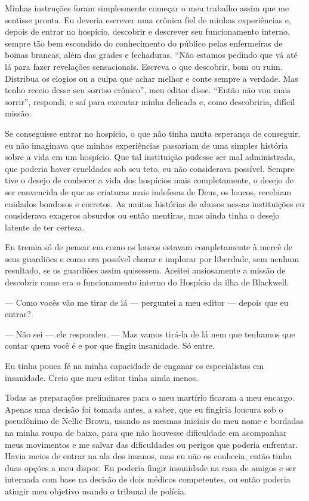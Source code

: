 Minhas instruções foram simplesmente começar o meu trabalho assim que me
sentisse pronta. Eu deveria escrever uma crônica fiel de minhas
experiências e, depois de entrar no hospício, descobrir e descrever seu
funcionamento interno, sempre tão bem escondido do conhecimento do
público pelas enfermeiras de boinas brancas, além das grades e
fechaduras. ``Não estamos pedindo que vá até lá para fazer revelações
sensacionais. Escreva o que descobrir, bom ou ruim. Distribua os elogios
ou a culpa que achar melhor e conte sempre a verdade. Mas tenho receio
desse seu sorriso crônico'', meu editor disse. ``Então não vou mais
sorrir'', respondi, e saí para executar minha delicada e, como
descobriria, difícil missão.

Se conseguisse entrar no hospício, o que não tinha muita esperança de
conseguir, eu não imaginava que minhas experiências passariam de uma
simples história sobre a vida em um hospício. Que tal instituição
pudesse ser mal administrada, que poderia haver crueldades sob seu teto,
eu não considerava possível. Sempre tive o desejo de conhecer a vida dos
hospícios mais completamente, o desejo de ser convencida de que as
criaturas mais indefesas de Deus, os loucos, recebiam cuidados bondosos
e corretos. As muitas histórias de abusos nessas instituições eu
considerava exageros absurdos ou então mentiras, mas ainda tinha o
desejo latente de ter certeza.

Eu tremia só de pensar em como os loucos estavam completamente à mercê
de seus guardiões e como era possível chorar e implorar por liberdade,
sem nenhum resultado, se os guardiões assim quisessem. Aceitei
ansiosamente a missão de descobrir como era o funcionamento interno do
Hospício da ilha de Blackwell.

--- Como vocês vão me tirar de lá --- perguntei a meu editor --- depois
que eu entrar?

--- Não sei --- ele respondeu. --- Mas vamos tirá-la de lá nem que
tenhamos que contar quem você é e por que fingiu insanidade. Só entre.

Eu tinha pouca fé na minha capacidade de enganar os especialistas em
insanidade. Creio que meu editor tinha ainda menos.

Todas as preparações preliminares para o meu martírio ficaram a meu
encargo. Apenas uma decisão foi tomada antes, a saber, que eu fingiria
loucura sob o pseudônimo de Nellie Brown, usando as mesmas iniciais do
meu nome e bordadas na minha roupa de baixo, para que não houvesse
dificuldade em acompanhar meus movimentos e me salvar das dificuldades
ou perigos que poderia enfrentar. Havia meios de entrar na ala dos
insanos, mas eu não os conhecia, então tinha duas opções a meu dispor.
Eu poderia fingir insanidade na casa de amigos e ser internada com base
na decisão de dois médicos competentes, ou então poderia atingir meu
objetivo usando o tribunal de polícia.

